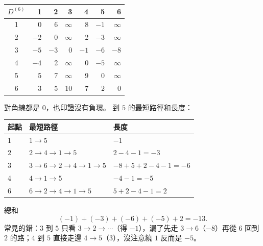 \begin{pastsoln}
\begin{center}
\small
\begin{tabular}{c|rrrrrr}
$D^{(6)}$ & 1 & 2 & 3 & 4 & 5 & 6 \\ \hline
1 & 0 & 6 & $\infty$ & 8 & $-1$ & $\infty$ \\
2 & $-2$ & 0 & $\infty$ & 2 & $-3$ & $\infty$ \\
3 & $-5$ & $-3$ & 0 & $-1$ & $-6$ & $-8$ \\
4 & $-4$ & 2 & $\infty$ & 0 & $-5$ & $\infty$ \\
5 & 5 & 7 & $\infty$ & 9 & 0 & $\infty$ \\
6 & 3 & 5 & 10 & 7 & 2 & 0 \\
\end{tabular}
\end{center}
對角線都是 $0$，也印證沒有負環。 到 $5$ 的最短路徑和長度：
\begin{center}
\small
\begin{tabular}{lll}
\toprule
起點 & 最短路徑 & 長度 \\
\midrule
1 & $1 \to 5$ & $-1$ \\
2 & $2 \to 4 \to 1 \to 5$ & $2 - 4 - 1 = -3$ \\
3 & $3 \to 6 \to 2 \to 4 \to 1 \to 5$ & $-8 + 5 + 2 - 4 - 1 = -6$ \\
4 & $4 \to 1 \to 5$ & $-4 - 1 = -5$ \\
6 & $6 \to 2 \to 4 \to 1 \to 5$ & $5 + 2 - 4 - 1 = 2$ \\
\bottomrule
\end{tabular}
\end{center}
總和
\[
(-1) + (-3) + (-6) + (-5) + 2 = -13.
\]
常見的錯：$3$ 到 $5$ 只看 $3 \to 2 \to \cdots$（得 $-1$），漏了先走 $3 \to 6$（$-8$）再從 $6$ 回到 $2$
的路；$4$ 到 $5$ 直接走邊 $4 \to 5$（$3$），沒注意繞 $1$ 反而是 $-5$。
\end{pastsoln}
